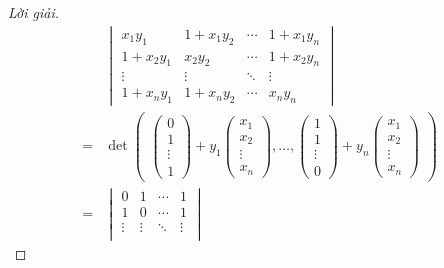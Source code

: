 \documentclass[class=nhvh-linear-algebra,crop=false]{standalone}
\begin{document}
\begin{proof}[Lời giải]
	\begingroup{}
	\allowdisplaybreaks{}
	\begin{align*}
		  & \begin{vmatrix}
			    x_{1}y_{1}     & 1 + x_{1}y_{2} & \cdots & 1 + x_{1}y_{n} \\
			    1 + x_{2}y_{1} & x_{2}y_{2}     & \cdots & 1 + x_{2}y_{n} \\
			    \vdots         & \vdots         & \ddots & \vdots         \\
			    1 + x_{n}y_{1} & 1 + x_{n}y_{2} & \cdots & x_{n}y_{n}
		    \end{vmatrix}                                                                                     \\
		= &
		\det\begin{pmatrix}
			    \begin{pmatrix}
				0      \\
				1      \\
				\vdots \\
				1
			\end{pmatrix}
			    +
			    y_{1}\begin{pmatrix}
				     x_{1}  \\
				     x_{2}  \\
				     \vdots \\
				     x_{n}
			     \end{pmatrix},
			    \ldots,
			    \begin{pmatrix}
				1      \\
				1      \\
				\vdots \\
				0
			\end{pmatrix}
			    +
			    y_{n}\begin{pmatrix}
				     x_{1}  \\
				     x_{2}  \\
				     \vdots \\
				     x_{n}
			     \end{pmatrix}
		    \end{pmatrix}                                                                                                              \\
		= &
		\begin{vmatrix}
			0      & 1      & \cdots & 1      \\
			1      & 0      & \cdots & 1      \\
			\vdots & \vdots & \ddots & \vdots \\

\end{vmatrix}
\end{align*}
\end{proof}
\end{document}
